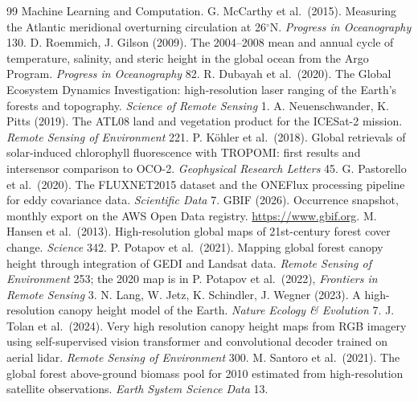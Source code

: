 \documentclass[10pt]{article}
\begin{document}
\begin{thebibliography}{99}
{Machine Learning and Computation}.
 G. McCarthy et al.\ (2015). Measuring the Atlantic
meridional overturning circulation at 26$^\circ$N. \emph{Progress in
Oceanography} 130.
 D. Roemmich, J. Gilson (2009). The 2004--2008 mean and
annual cycle of temperature, salinity, and steric height in the global
ocean from the Argo Program. \emph{Progress in Oceanography} 82.
 R. Dubayah et al.\ (2020). The Global Ecosystem Dynamics
Investigation: high-resolution laser ranging of the Earth's forests and
topography. \emph{Science of Remote Sensing} 1.
 A. Neuenschwander, K. Pitts (2019). The ATL08 land and
vegetation product for the ICESat-2 mission. \emph{Remote Sensing of
Environment} 221.
 P. K\"ohler et al.\ (2018). Global retrievals of
solar-induced chlorophyll fluorescence with TROPOMI: first results and
intersensor comparison to OCO-2. \emph{Geophysical Research Letters} 45.
 G. Pastorello et al.\ (2020). The FLUXNET2015 dataset and
the ONEFlux processing pipeline for eddy covariance data. \emph{Scientific
Data} 7.
 GBIF (2026). Occurrence snapshot, monthly export on the AWS
Open Data registry. \url{https://www.gbif.org}.
 M. Hansen et al.\ (2013). High-resolution global maps of
21st-century forest cover change. \emph{Science} 342.
 P. Potapov et al.\ (2021). Mapping global forest canopy
height through integration of GEDI and Landsat data. \emph{Remote Sensing of
Environment} 253; the 2020 map is in P. Potapov et al.\ (2022), \emph{Frontiers
in Remote Sensing} 3.
 N. Lang, W. Jetz, K. Schindler, J. Wegner (2023). A
high-resolution canopy height model of the Earth. \emph{Nature Ecology \&
Evolution} 7.
 J. Tolan et al.\ (2024). Very high resolution canopy height
maps from RGB imagery using self-supervised vision transformer and
convolutional decoder trained on aerial lidar. \emph{Remote Sensing of
Environment} 300.
 M. Santoro et al.\ (2021). The global forest
above-ground biomass pool for 2010 estimated from high-resolution satellite
observations. \emph{Earth System Science Data} 13.
\end{thebibliography}

\appendix
\end{document}
